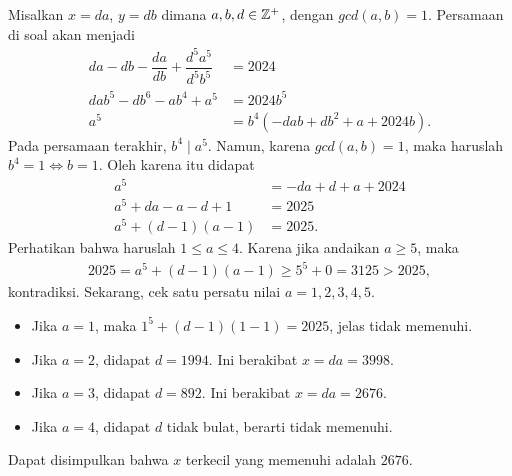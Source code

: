 
\begin{solusi}
    Misalkan $x=da$, $y=db$ dimana $a,b,d \in \mathbb Z^+$, dengan $gcd(a,b)=1$. Persamaan di soal akan menjadi
    \begin{align*}
        da-db-\dfrac{da}{db}+\dfrac{d^5a^5}{d^5b^5} &= 2024\\
        dab^5-db^6-ab^4+a^5 &= 2024b^5\\
        a^5 &= b^4(-dab+db^2+a+2024b).
    \end{align*}
    Pada persamaan terakhir, $b^4 \mid a^5$. Namun, karena $gcd(a,b)=1$, maka haruslah $b^4=1 \iff b=1$. Oleh karena itu didapat
    \begin{align*}
        a^5 &= -da+d+a+2024\\
        a^5 + da - a - d + 1 &= 2025\\
        a^5 + (d-1)(a-1) &= 2025.
    \end{align*}
    Perhatikan bahwa haruslah $1 \le a \le 4$. Karena jika andaikan $a\ge 5$, maka
    \begin{align*}
        2025 = a^5 + (d-1)(a-1) \ge 5^5 + 0 = 3125 > 2025,
    \end{align*}
    kontradiksi.
    Sekarang, cek satu persatu nilai $a=1,2,3,4,5$.
    \begin{itemize}
        \item Jika $a=1$, maka $1^5+(d-1)(1-1) = 2025$, jelas tidak memenuhi.
        \item Jika $a=2$, didapat $d=1994$. Ini berakibat $x=da=3998$.
        \item Jika $a=3$, didapat $d=892$. Ini berakibat $x=da=2676$.
        \item Jika $a=4$, didapat $d$ tidak bulat, berarti tidak memenuhi.
    \end{itemize}
    Dapat disimpulkan bahwa $x$ terkecil yang memenuhi adalah $\boxed{2676}$.
\end{solusi}